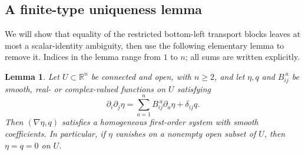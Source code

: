 \documentclass[11pt]{article}
\newcommand{\R}{\mathbb R}
\newtheorem{lemma}[theorem]{Lemma}
\theoremstyle{remark}
\numberwithin{equation}{section}
\begin{document}
\subsection{A finite-type uniqueness lemma}

We will show that equality of the restricted bottom-left transport blocks
leaves at most a scalar-identity ambiguity, then use the following
elementary lemma to remove it. Indices
in the lemma range from $1$ to $n$; all sums are written explicitly.

\begin{lemma}\label{lem:finite-type}
Let $U\subset\R^n$ be connected and open, with $n\ge2$, and let
$\eta,q$ and $B_{ij}^{\ a}$ be smooth, real- or complex-valued functions
on $U$ satisfying
\begin{equation}\label{eq:finite-type-hypothesis}
 \partial_i\partial_j\eta
    =\sum_{a=1}^n B_{ij}^{\ a}\partial_a\eta+\delta_{ij}q.
\end{equation}
Then $(\nabla\eta,q)$ satisfies a homogeneous first-order system with
smooth coefficients.  In particular, if $\eta$ vanishes on a nonempty
open subset of $U$, then $\eta=q=0$ on $U$.
\end{lemma}
\end{document}
